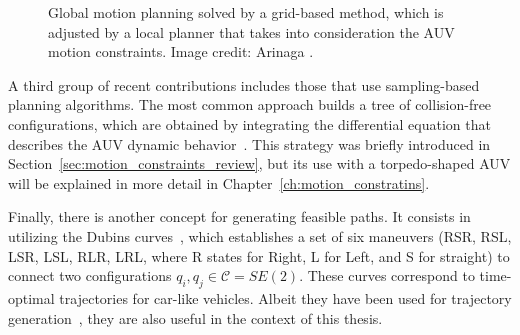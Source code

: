\begin{figure}[htbp]
    \myfloatalign
     \quad
\caption[Combination of a grid-based planning method and a local planner
to include the AUV motion constraints.]
{\protect {} Global motion planning solved
by a grid-based method, \protect {} which is
adjusted by a local planner that takes into consideration the AUV motion
constraints. Image credit: Arinaga \etal\cite{Arinaga1996}.}
\label{fig:GridBasedLocalConstrAUV}
\end{figure}

A third group of recent contributions includes those that use sampling-based
planning algorithms. The most common approach builds a tree of collision-free
configurations, which are obtained by integrating the differential equation that
describes the \ac{AUV} dynamic behavior~\cite{Tan2004,Caldwell2010,Heo2013}.
This strategy was briefly introduced in
Section~\ref{sec:motion_constraints_review}, but its use with a torpedo-shaped
\ac{AUV} will be explained in more detail in
Chapter~\ref{ch:motion_constratins}.

Finally, there is another concept for generating feasible paths. It consists in
utilizing the Dubins curves~\cite{Dubins1957}, which establishes a set of six
maneuvers (RSR, RSL, LSR, LSL, RLR, LRL, where R states for Right, L for Left,
and S for straight) to connect two configurations $q_i,q_j \in \mathcal{C} =
SE(2)$. These curves correspond to time-optimal trajectories for car-like
vehicles. Albeit they have been used for trajectory
generation~\cite{Wehbe2014,Cao2016}, they are also useful in the context of this
thesis.


